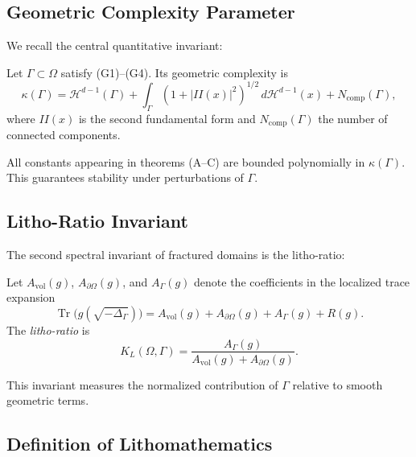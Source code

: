 \subsection{Geometric Complexity Parameter}

We recall the central quantitative invariant:

\begin{definition}
Let $\Gamma \subset \Omega$ satisfy (G1)--(G4). Its geometric complexity is
\[
  \kappa(\Gamma) =
  \mathcal{H}^{d-1}(\Gamma)
  + \int_\Gamma (1+|II(x)|^2)^{1/2}\, d\mathcal{H}^{d-1}(x)
  + N_{\mathrm{comp}}(\Gamma),
\]
where $II(x)$ is the second fundamental form and $N_{\mathrm{comp}}(\Gamma)$
the number of connected components.
\end{definition}

\begin{remark}
All constants appearing in theorems (A–C) are bounded polynomially in
$\kappa(\Gamma)$. This guarantees stability under perturbations of $\Gamma$.
\end{remark}

\subsection{Litho-Ratio Invariant}

The second spectral invariant of fractured domains is the litho-ratio:

\begin{definition}
Let $A_{\mathrm{vol}}(g)$, $A_{\partial\Omega}(g)$, and $A_\Gamma(g)$ denote
the coefficients in the localized trace expansion
\[
\operatorname{Tr}\!\big(g(\sqrt{-\Delta_\Gamma})\big) =
A_{\mathrm{vol}}(g) + A_{\partial\Omega}(g) + A_\Gamma(g) + R(g).
\]
The \emph{litho-ratio} is
\[
K_L(\Omega,\Gamma) = \frac{A_\Gamma(g)}{A_{\mathrm{vol}}(g)+A_{\partial\Omega}(g)}.
\]
\end{definition}

This invariant measures the normalized contribution of $\Gamma$ relative to
smooth geometric terms.

\subsection{Definition of Lithomathematics}

